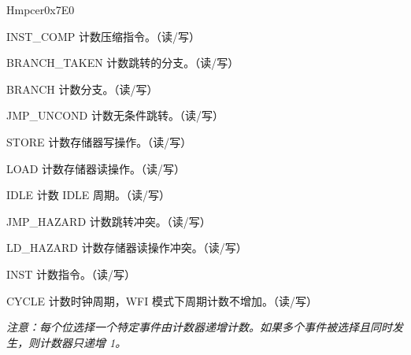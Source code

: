 \begin{register}{H}{mpcer}{0x7E0}\label{regdesc:MPCER}
%
%
%
%
%
%
%
%
%
%
%
%
\regnewline%
\begin{regdesc}\begin{reglist}
\label{fielddesc:INST_COMP}\item [INST\_COMP] 计数压缩指令。（读/写）
\label{fielddesc:BRANCH_TAKEN}\item [BRANCH\_TAKEN] 计数跳转的分支。（读/写）
\label{fielddesc:BRANCH}\item [BRANCH] 计数分支。（读/写）
\label{fielddesc:JUMP_UNCONDITIONAL}\item [JMP\_UNCOND] 计数无条件跳转。（读/写）
\label{fielddesc:STORE}\item [STORE] 计数存储器写操作。（读/写）
\label{fielddesc:LOAD}\item  [LOAD] 计数存储器读操作。（读/写）
\label{fielddesc:IDLE}\item  [IDLE] 计数 IDLE 周期。（读/写）
\label{fielddesc:JUMP_HAZARDS}\item  [JMP\_HAZARD] 计数跳转冲突。（读/写）
\label{fielddesc:LOAD_HAZARDS}\item  [LD\_HAZARD] 计数存储器读操作冲突。（读/写）
\label{fielddesc:INSTRUCTION}\item  [INST] 计数指令。（读/写）
\label{fielddesc:CYCLES}\item  [CYCLE] 计数时钟周期，WFI 模式下周期计数不增加。（读/写）

\textit{注意：每个位选择一个特定事件由计数器递增计数。如果多个事件被选择且同时发生，则计数器只递增 1。 }

\end{reglist}\end{regdesc}
\end{register}


